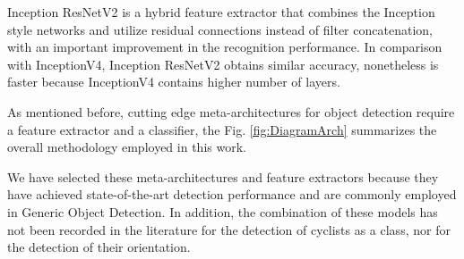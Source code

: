 \documentclass[journal]{IEEEtran}
\begin{document}
Inception ResNetV2 \cite{szegedy2017inception} is a hybrid feature extractor that combines the Inception style networks and utilize residual connections instead of filter concatenation, with an important improvement in the recognition performance. In comparison with InceptionV4, Inception ResNetV2 obtains similar accuracy, nonetheless is faster because InceptionV4 contains higher number of layers.

As mentioned before, cutting edge meta-architectures for object detection require a feature extractor and a classifier, the Fig. \ref{fig:DiagramArch} summarizes the overall methodology employed in this work.

We have selected these meta-architectures and feature extractors because they have achieved state-of-the-art detection performance and are commonly employed in Generic Object Detection. In addition, the combination of these models has not been recorded in the literature for the detection of cyclists as a class, nor for the detection of their orientation.
\end{document}
